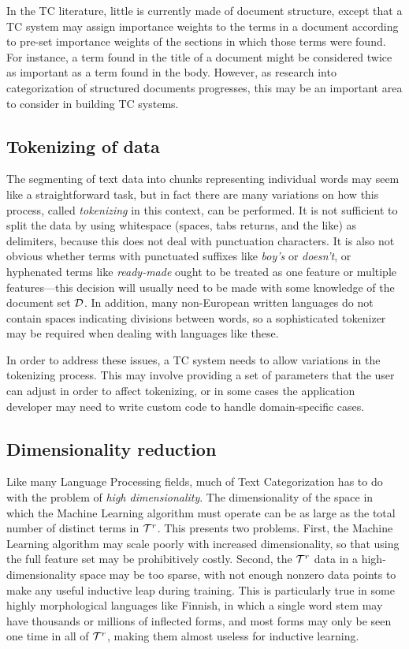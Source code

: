 In the TC literature, little is currently made of document structure,
except that a TC system may assign importance weights to the terms in
a document according to pre-set importance weights of the sections in
which those terms were found.  For instance, a term found in the title
of a document might be considered twice as important as a term found
in the body.  However, as research into categorization of structured
documents progresses, this may be an important area to consider in
building TC systems.

\subsection{Tokenizing of data}

The segmenting of text data into chunks representing individual words
may seem like a straightforward task, but in fact there are many
variations on how this process, called \emph{tokenizing} in this
context, can be performed.\cite[p. XXX]{manning:99} It is not
sufficient to split the data by using whitespace (spaces, tabs
returns, and the like) as delimiters, because this does not deal with
punctuation characters.  It is also not obvious whether terms with
punctuated suffixes like \emph{boy's} or \emph{doesn't}, or hyphenated terms
like \emph{ready-made} ought to be treated as one feature or multiple
features---this decision will usually need to be made with some
knowledge of the document set $\mathcal{D}$.  In addition, many non-European
written languages do not contain spaces indicating divisions between
words, so a sophisticated tokenizer may be required when dealing with
languages like these.

In order to address these issues, a TC system needs to allow
variations in the tokenizing process.  This may involve providing a
set of parameters that the user can adjust in order to affect
tokenizing, or in some cases the application developer may need to
write custom code to handle domain-specific cases.

\subsection{Dimensionality reduction}

Like many Language Processing fields, much of Text Categorization has
to do with the problem of \emph{high dimensionality}.
\cite[p. 13]{sebastiani:02} \cite[p. XXX]{manning:99} \cite{joachims:98} The
dimensionality of the space in which the Machine Learning algorithm
must operate can be as large as the total number of distinct terms in
$\mathcal{T}^r$.  This presents two problems.  First, the Machine Learning
algorithm may scale poorly with increased dimensionality, so that
using the full feature set may be prohibitively costly.  Second, the
$\mathcal{T}^r$ data in a high-dimensionality space may be too sparse, with
not enough nonzero data points to make any useful inductive leap
during training.  This is particularly true in some highly
morphological languages like Finnish, in which a single word stem may
have thousands or millions of inflected forms, and most forms may only
be seen one time in all of $\mathcal{T}^r$, making them almost useless for
inductive learning.

